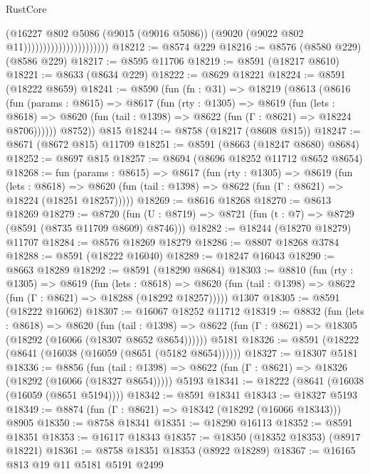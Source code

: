 \begin{lexlean}{RustCore}
\begin{coremodule}
                                          (@16227
                                            @802
                                            @5086
                                            (@9015 (@9016 @5086))
                                            (@9020 (@9022 @802 @11))))))))))))))))))))))
@18212 := @8574 @229
@18216 := @8576 (@8580 @229) (@8586 @229)
@18217 := @8595 @11706
@18219 := @8591 (@18217 @8610)
@18221 := @8633 (@8634 @229)
@18222 := @8629 @18221
@18224 := @8591 (@18222 @8659)
@18241 := @8590
    (fun (fn : @31) =>
    @18219
      (@8613
        (@8616
          (fun (params : @8615) =>
          @8617
            (fun (rty : @1305) =>
            @8619
              (fun (lets : @8618) =>
              @8620 (fun (tail : @1398) => @8622 (fun (Γ : @8621) => @18224 @8706))))))
        @8752))
    @815
@18244 := @8758 (@18217 (@8608 @815))
@18247 := @8671 (@8672 @815) @11709
@18251 := @8591 (@8663 (@18247 @8680) @8684)
@18252 := @8697 @815
@18257 := @8694 (@8696 @18252 @11712 @8652 @8654)
@18268 := fun (params : @8615) =>
  @8617
    (fun (rty : @1305) =>
    @8619
      (fun (lets : @8618) =>
      @8620 (fun (tail : @1398) => @8622 (fun (Γ : @8621) => @18224 (@18251 @18257)))))
@18269 := @8616 @18268
@18270 := @8613 @18269
@18279 := @8720
    (fun (U : @8719) => @8721 (fun (t : @7) => @8729 (@8591 (@8735 @11709 @8609) @8746)))
@18282 := @18244 (@18270 @18279) @11707
@18284 := @8576 @18269 @18279
@18286 := @8807 @18268 @3784
@18288 := @8591 (@18222 @16040)
@18289 := @18247 @16043
@18290 := @8663 @18289
@18292 := @8591 (@18290 @8684)
@18303 := @8810
    (fun (rty : @1305) =>
    @8619
      (fun (lets : @8618) =>
      @8620 (fun (tail : @1398) => @8622 (fun (Γ : @8621) => @18288 (@18292 @18257)))))
    @1307
@18305 := @8591 (@18222 @16062)
@18307 := @16067 @18252 @11712
@18319 := @8832
    (fun (lets : @8618) =>
    @8620
      (fun (tail : @1398) =>
      @8622 (fun (Γ : @8621) => @18305 (@18292 (@16066 (@18307 @8652 @8654))))))
    @5181
@18326 := @8591 (@18222 (@8641 (@16038 (@16059 (@8651 (@5182 @8654))))))
@18327 := @18307 @5181
@18336 := @8856
    (fun (tail : @1398) => @8622 (fun (Γ : @8621) => @18326 (@18292 (@16066 (@18327 @8654)))))
    @5193
@18341 := @18222 (@8641 (@16038 (@16059 (@8651 @5194))))
@18342 := @8591 @18341
@18343 := @18327 @5193
@18349 := @8874 (fun (Γ : @8621) => @18342 (@18292 (@16066 @18343))) @8905
@18350 := @8758 @18341
@18351 := @18290 @16113
@18352 := @8591 @18351
@18353 := @16117 @18343
@18357 := @18350 (@18352 @18353) (@8917 @18221)
@18361 := @8758 @18351 @18353 (@8922 @18289)
@18367 := @16165 @813 @19 @11 @5181 @5191 @2499

\end{coremodule}
\end{lexlean}
